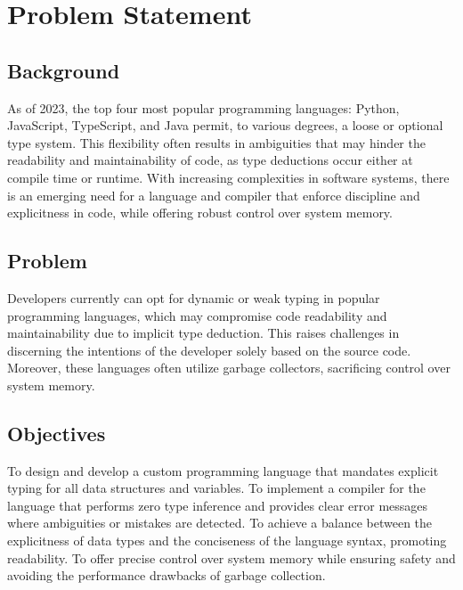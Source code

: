 \section{Problem Statement}
\label{sec:ProblemStatement}

\subsection{Background}

As of 2023, the top four most popular programming languages: Python, JavaScript,
TypeScript, and Java permit, to various degrees, a loose or optional type
system\cite{STACK}. This flexibility often results in ambiguities that may hinder the
readability and maintainability of code, as type deductions occur either at compile
time or runtime. With increasing complexities in software systems, there is an
emerging need for a language and compiler that enforce discipline and explicitness in
code, while offering robust control over system memory.

\subsection{Problem}

Developers currently can opt for dynamic or weak typing in popular programming
languages, which may compromise code readability and maintainability due to implicit
type deduction. This raises challenges in discerning the intentions of the developer
solely based on the source code. Moreover, these languages often utilize garbage
collectors, sacrificing control over system memory.

\subsection{Objectives}

To design and develop a custom programming language that mandates explicit typing for
all data structures and variables. To implement a compiler for the language that
performs zero type inference and provides clear error messages where ambiguities or
mistakes are detected. To achieve a balance between the explicitness of data types
and the conciseness of the language syntax, promoting readability. To offer precise
control over system memory while ensuring safety and avoiding the performance
drawbacks of garbage collection.


